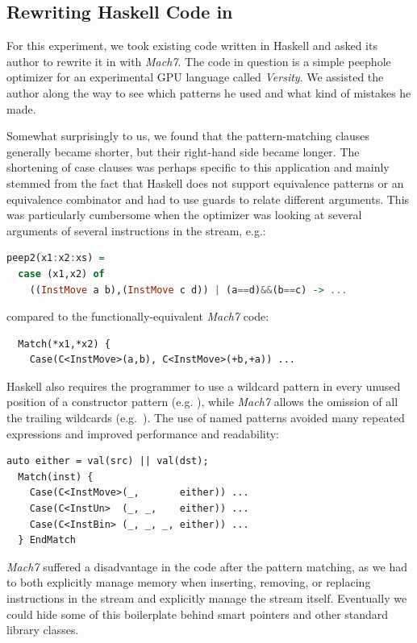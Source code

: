 \subsection{Rewriting Haskell Code in \Cpp{}}
\label{sec:qualcmp}

For this experiment, we took existing code written in Haskell and asked its author to 
rewrite it in \Cpp{} with \emph{Mach7}. The code in question is a simple 
peephole optimizer for an experimental GPU language called 
\emph{Versity}. We assisted the author along the way to see which 
patterns he used and what kind of mistakes he made.

Somewhat surprisingly to us, we found that the pattern-matching clauses generally 
became shorter, but their right-hand side became longer. The shortening of case 
clauses was perhaps specific to this application and mainly stemmed from the 
fact that Haskell does not support equivalence patterns or an equivalence 
combinator and had to use guards to relate different arguments. This was 
particularly cumbersome when the optimizer was looking at several arguments of 
several instructions in the stream, e.g.:

\begin{lstlisting}[language=Haskell]
peep2(x1:x2:xs) =
  case (x1,x2) of
    ((InstMove a b),(InstMove c d)) | (a==d)&&(b==c) -> ...
\end{lstlisting}

\noindent compared to the functionally-equivalent \emph{Mach7} code:

\begin{lstlisting}
  Match(*x1,*x2) {
    Case(C<InstMove>(a,b), C<InstMove>(+b,+a)) ...
\end{lstlisting}

\noindent
Haskell also requires the programmer to use a wildcard pattern in every unused position of a 
constructor pattern (e.g. ), while \emph{Mach7} 
allows the omission of all the trailing wildcards (e.g.~). 
The use of named patterns avoided many repeated expressions and 
improved performance and readability:

\begin{lstlisting}[columns=flexible]
  auto either = val(src) || val(dst);
  Match(inst) {
    Case(C<InstMove>(_,       either)) ...
    Case(C<InstUn>  (_, _,    either)) ...
    Case(C<InstBin> (_, _, _, either)) ...
  } EndMatch
\end{lstlisting}

\noindent
\emph{Mach7} suffered a disadvantage in the code after the pattern matching, as we had to both
explicitly manage memory when inserting,
removing, or replacing instructions in 
the stream and explicitly manage the stream itself. Eventually we could 
hide some of this boilerplate behind smart pointers and other standard library 
classes.

